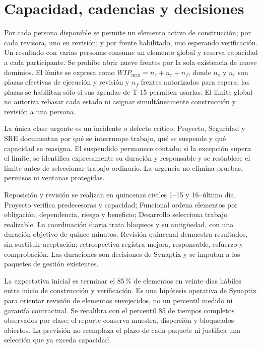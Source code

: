 \section{Capacidad, cadencias y decisiones}
Por cada persona disponible se permite un elemento activo de construcción; por cada revisora, uno en revisión; y por frente habilitado, uno esperando verificación. Un resultado con varias personas consume un elemento global y reserva capacidad a cada participante. Se prohíbe abrir nueve frentes por la sola existencia de nueve dominios. El límite se expresa como $WIP_{\max}=n_e+n_r+n_f$, donde $n_e$ y $n_r$ son plazas efectivas de ejecución y revisión y $n_f$ frentes autorizados para espera; las plazas se habilitan sólo si sus agendas de T-15 permiten usarlas. El límite global no autoriza rebasar cada estado ni asignar simultáneamente construcción y revisión a una persona.

La única clase urgente es un incidente o defecto crítico. Proyecto, Seguridad y SRE documentan por qué se interrumpe trabajo, qué se suspende y qué capacidad se reasigna. El suspendido permanece contado; si la excepción supera el límite, se identifica expresamente su duración y responsable y se restablece el límite antes de seleccionar trabajo ordinario. La urgencia no elimina pruebas, permisos ni ventanas protegidas. \parencite[Actively Managing Items in a Workflow, p.~4]{sd6-kanban}

Reposición y revisión se realizan en quincenas civiles 1--15 y 16--último día. Proyecto verifica predecesoras y capacidad; Funcional ordena elementos por obligación, dependencia, riesgo y beneficio; Desarrollo selecciona trabajo realizable. La coordinación diaria trata bloqueos y su antigüedad, con una duración objetivo de quince minutos. Revisión quincenal demuestra resultados, sin sustituir aceptación; retrospectiva registra mejora, responsable, esfuerzo y comprobación. Las duraciones son decisiones de Synaptix y se imputan a los paquetes de gestión existentes.

La expectativa inicial es terminar el 85\,\% de elementos en veinte días hábiles entre inicio de construcción y verificación. Es una hipótesis operativa de Synaptix para orientar revisión de elementos envejecidos, no un percentil medido ni garantía contractual. Se recalibra con el percentil 85 de tiempos completos observados por clase; el reporte conserva muestra, dispersión y bloqueados abiertos. La previsión no reemplaza el plazo de cada paquete ni justifica una selección que ya exceda capacidad. \parencite[Definition of Workflow y Flow Metrics, pp.~3--5]{sd6-kanban}

